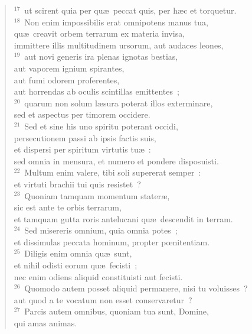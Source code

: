 \begin{flushleft}
\begin{verse}
${}^{17}$~ut scirent quia per qu\ae\ peccat quis, per h\ae c et torquetur.\\
${}^{18}$~Non enim impossibilis erat omnipotens manus tua,\\ qu\ae\ creavit orbem terrarum ex materia invisa,\\ immittere illis multitudinem ursorum, aut audaces leones,\\
${}^{19}$~aut novi generis ira plenas ignotas bestias,\\ aut vaporem ignium spirantes,\\ aut fumi odorem proferentes,\\ aut horrendas ab oculis scintillas emittentes~;\\
${}^{20}$~quarum non solum l\ae sura poterat illos exterminare,\\ sed et aspectus per timorem occidere.\\
${}^{21}$~Sed et sine his uno spiritu poterant occidi,\\ persecutionem passi ab ipsis factis suis,\\ et dispersi per spiritum virtutis tu\ae~:\\ sed omnia in mensura, et numero et pondere disposuisti.\\
${}^{22}$~Multum enim valere, tibi soli supererat semper~:\\ et virtuti brachii tui quis resistet~?\\
${}^{23}$~Quoniam tamquam momentum stater\ae ,\\ sic est ante te orbis terrarum,\\ et tamquam gutta roris antelucani qu\ae\ descendit in terram.\\
${}^{24}$~Sed misereris omnium, quia omnia potes~;\\ et dissimulas peccata hominum, propter pœnitentiam.\\
${}^{25}$~Diligis enim omnia qu\ae\ sunt,\\ et nihil odisti eorum qu\ae\ fecisti~;\\ nec enim odiens aliquid constituisti aut fecisti.\\
${}^{26}$~Quomodo autem posset aliquid permanere, nisi tu voluisses~?\\ aut quod a te vocatum non esset conservaretur~?\\
${}^{27}$~Parcis autem omnibus, quoniam tua sunt, Domine,\\ qui amas animas.\end{verse}\end{flushleft}



